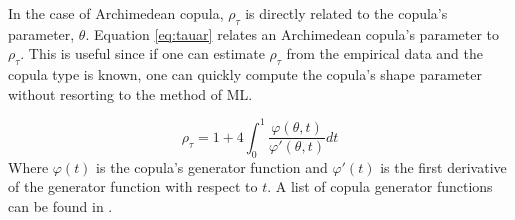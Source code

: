 In the case of Archimedean copula, $\rho_\tau$ is directly related to the copula's parameter, $\theta$.
Equation \ref{eq:tauar} relates an Archimedean copula's parameter to $\rho_\tau$.  This is useful since if one can estimate $\rho_\tau$ from the empirical data and the copula type is known, one can quickly compute the copula's shape parameter without resorting to the method of ML.

\begin{equation}
\rho_\tau = 1 + 4 \int_0^1 \frac{\varphi(\theta,t)}{\varphi'(\theta, t)}dt
\label{eq:tauar}
\end{equation}
Where $\varphi(t)$ is the copula's generator function and $\varphi'(t)$ is the first derivative of the generator function with respect to $t$. A list of copula generator functions can be found in \cite{Nelsen2006}. 




